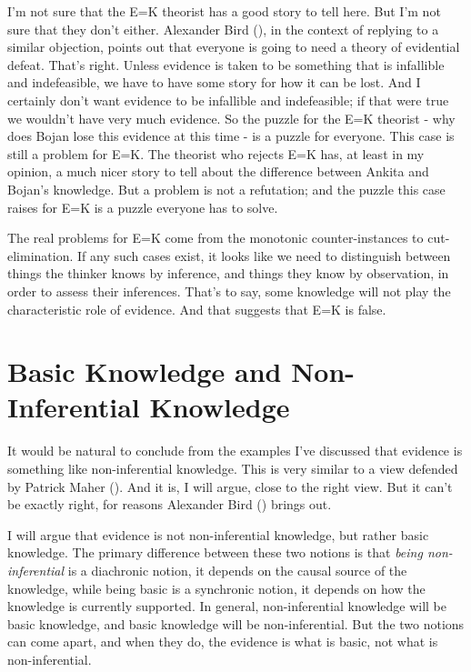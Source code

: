 \documentclass[
  12pt,
  letterpaper,
]{scrbook}
\begin{document}
I'm not sure that the E=K theorist has a good story to tell here. But
I'm not sure that they don't either. Alexander Bird
(), in the context of replying to a similar
objection, points out that everyone is going to need a theory of
evidential defeat. That's right. Unless evidence is taken to be
something that is infallible and indefeasible, we have to have some
story for how it can be lost. And I certainly don't want evidence to be
infallible and indefeasible; if that were true we wouldn't have very
much evidence. So the puzzle for the E=K theorist - why does Bojan lose
this evidence at this time - is a puzzle for everyone. This case is
still a problem for E=K. The theorist who rejects E=K has, at least in
my opinion, a much nicer story to tell about the difference between
Ankita and Bojan's knowledge. But a problem is not a refutation; and the
puzzle this case raises for E=K is a puzzle everyone has to solve.

The real problems for E=K come from the monotonic counter-instances to
cut-elimination. If any such cases exist, it looks like we need to
distinguish between things the thinker knows by inference, and things
they know by observation, in order to assess their inferences. That's to
say, some knowledge will not play the characteristic role of evidence.
And that suggests that E=K is false.

\section{Basic Knowledge and Non-Inferential Knowledge}\label{sec-basic}

It would be natural to conclude from the examples I've discussed that
evidence is something like non-inferential knowledge. This is very
similar to a view defended by Patrick Maher
(). And it is, I will argue, close to the
right view. But it can't be exactly right, for reasons Alexander Bird
() brings out.

I will argue that evidence is not non-inferential knowledge, but rather
basic knowledge. The primary difference between these two notions is
that \emph{being non-inferential} is a diachronic notion, it depends on
the causal source of the knowledge, while being basic is a synchronic
notion, it depends on how the knowledge is currently supported. In
general, non-inferential knowledge will be basic knowledge, and basic
knowledge will be non-inferential. But the two notions can come apart,
and when they do, the evidence is what is basic, not what is
non-inferential.
\end{document}
